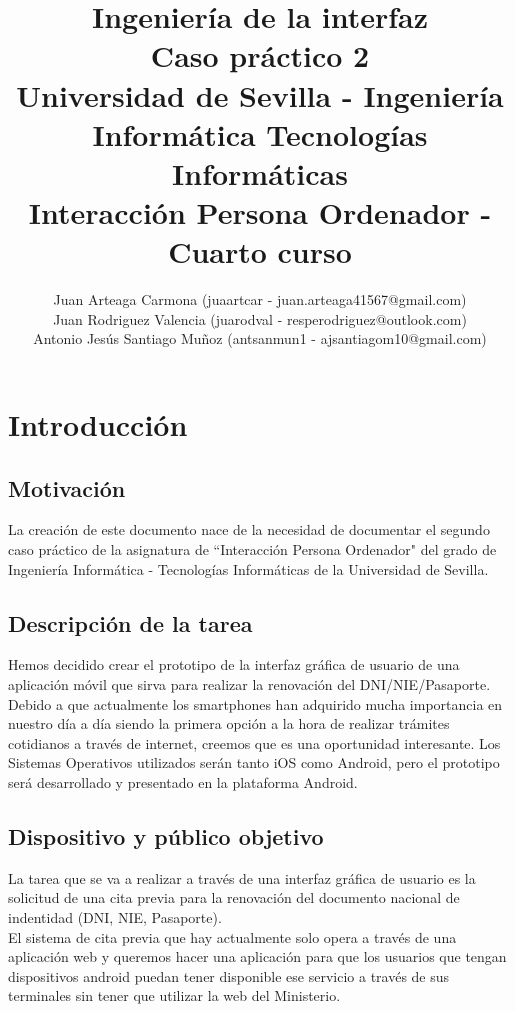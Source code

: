 \documentclass[a4paper,11pt]{article}
\title{
        \textbf{Ingeniería de la interfaz}\large\\
        \textbf{Caso práctico 2}\\
        \medskip
        Universidad de Sevilla - Ingeniería Informática Tecnologías Informáticas\\
        Interacción Persona Ordenador - Cuarto curso}
\author{Juan Arteaga Carmona (juaartcar - juan.arteaga41567@gmail.com)\\
        Juan Rodriguez Valencia (juarodval - resperodriguez@outlook.com)\\
        Antonio Jesús Santiago Muñoz (antsanmun1 - ajsantiagom10@gmail.com)\\
}
\begin{document}
\maketitle

\newpage
\tableofcontents
\listoffigures
\newpage



\section{Introducción}
\subsection{Motivación}
La creación de este documento nace de la necesidad de documentar el segundo caso práctico de la asignatura de ``Interacción Persona Ordenador" del grado de Ingeniería Informática - Tecnologías Informáticas de la Universidad de Sevilla.

\subsection{Descripción de la tarea}
Hemos decidido crear el prototipo de la interfaz gráfica de usuario de una aplicación móvil que sirva para realizar la renovación del DNI/NIE/Pasaporte. Debido a que actualmente los smartphones han adquirido mucha importancia en nuestro día a día siendo la primera opción a la hora de realizar trámites cotidianos a través de internet, creemos que es una oportunidad interesante. Los Sistemas Operativos utilizados serán tanto iOS como Android, pero el prototipo será desarrollado y presentado en la plataforma Android.\\

\subsection{Dispositivo y público objetivo}
La tarea que se va a realizar a través de una interfaz gráfica de usuario es la solicitud de una cita previa para la renovación del documento nacional de indentidad (DNI, NIE, Pasaporte).\\
El sistema de cita previa que hay actualmente solo opera a través de una aplicación web\cite{webcitaDNI} y queremos hacer una aplicación para que los usuarios que tengan dispositivos android puedan tener disponible ese servicio a través de sus terminales sin tener que utilizar la web del Ministerio.\\
\end{document}
